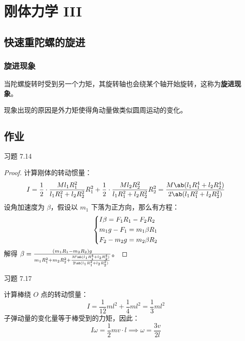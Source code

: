 \section{刚体力学 III}

\subsection{快速重陀螺的旋进}

\subsubsection{旋进现象}

当陀螺旋转时受到另一个力矩，其旋转轴也会绕某个轴开始旋转，这称为\textbf{旋进现象}。

现象出现的原因是外力矩使得角动量做类似圆周运动的变化。

\subsection{作业}

\begin{problem}
    习题 7.14
    \begin{proof}
        计算刚体的转动惯量：
        $$
        I = \frac{1}{2} \cdot \frac{M l_1 R_1^2}{l_1 R_1^2 + l_2 R_2^2} R_1^2 + \frac{1}{2} \cdot \frac{M l_2 R_2^2}{l_1 R_1^2 + l_2 R_2^2} R_2^2 = \frac{M \ab(l_1 R_1^4 + l_2 R_2^4)}{2 \ab(l_1 R_1^2 + l_2 R_2^2)}
        $$
        设角加速度为 $\beta$，假设以 $m_1$ 下落为正方向，那么有方程：
        $$
        \begin{dcases}
            I \beta = F_1 R_1 - F_2 R_2 \\
            m_1 g - F_1 = m_1 \beta R_1 \\
            F_2 - m_2 g = m_2 \beta R_2\\
        \end{dcases}
        $$
        解得 $\beta = \frac{(m_1 R_1 - m_2 R_2) g}{m_1 R_1^2 + m_2 R_2^2 + \frac{M \ab(l_1 R_1^4 + l_2 R_2^4)}{2 \ab(l_1 R_1^2 + l_2 R_2^2)}}$。
    \end{proof}
\end{problem}

\begin{problem}
    习题 7.17
    \begin{solution}
        计算棒绕 $O$ 点的转动惯量：
        $$
        I = \frac{1}{12} m l^2 + \frac{1}{4} m l^2 = \frac{1}{3} m l^2
        $$
        子弹动量的变化量等于棒受到的力矩，因此：
        $$
        I \omega = \frac{1}{2} m v \cdot l \implies \omega = \frac{3 v}{2 l}
        $$
    \end{solution}
\end{problem}

